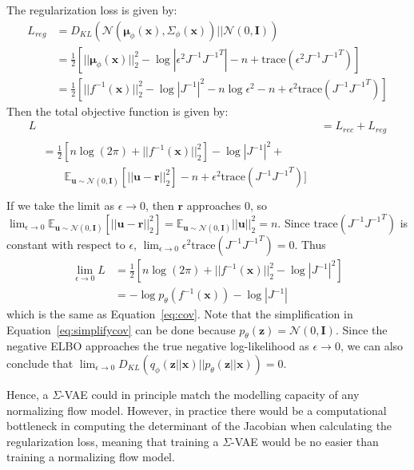 \documentclass{article}
\begin{document}
The regularization loss is given by:
\begin{align}
    L_{reg} &= D_{KL} ( \mathcal{N}(\boldsymbol \mu_\phi(\mathbf{x}), \Sigma_\phi(\mathbf{x})) || \mathcal{N}(0,\mathbf{I}) )\\
    &= \frac{1}{2}[|| \boldsymbol \mu_\phi(\mathbf{x}) ||_2^2 - \log |\epsilon^2 J^{-1} {J^{-1}}^T| - n + \text{trace}(\epsilon^2 J^{-1} {J^{-1}}^T) ]\\
    &=  \frac{1}{2}[|| f^{-1}(\mathbf{x}) ||_2^2 - \log |J^{-1}|^2 - n \log \epsilon^2 - n + \epsilon^2 \text{trace} ( J^{-1} {J^{-1}}^T)]
\end{align}
Then the total objective function is given by:
\begin{align}
    L &=L_{rec}+L_{reg}\\
    \begin{split}
        &= \frac{1}{2} [ n\log(2 \pi ) + || f^{-1}(\mathbf{x}) ||_2^2] - \log |J^{-1}|^2  + \\
       &\qquad  \mathbb{E}_{\mathbf{u}\sim \mathcal{N}(0,\mathbf{I})}[||\mathbf{u}-\mathbf{r}||_2^2] - n + \epsilon^2 \text{trace} ( J^{-1} {J^{-1}}^T)]\\
    \end{split} 
\end{align}
If we take the limit as $\epsilon \to 0$, then $\mathbf{r}$ approaches $0$, so  $\lim_{\epsilon\to 0} \mathbb{E}_{\mathbf{u}\sim \mathcal{N}(0,\mathbf{I})}[||\mathbf{u}-\mathbf{r}||_2^2] = \mathbb{E}_{\mathbf{u}\sim \mathcal{N}(0,\mathbf{I})}||\mathbf{u}||_2^2 = n$.
Since $\text{trace} ( J^{-1} {J^{-1}}^T)$ is constant with respect to $\epsilon$, $\lim_{\epsilon\to 0} \epsilon^2 \text{trace} ( J^{-1} {J^{-1}}^T) = 0$.
Thus 
\begin{align}
    \lim_{\epsilon\to 0} L &= \frac{1}{2} [ n\log(2 \pi ) + || f^{-1}(\mathbf{x}) ||_2^2 - \log |J^{-1}|^2 ] \\ 
    &= -\log p_\theta(f^{-1}(\mathbf{x})) - \log |J^{-1}| \label{eq:simplifycov}
\end{align}
which is the same as Equation~\ref{eq:cov}. 
Note that the simplification in Equation~\ref{eq:simplifycov} can be done because $p_\theta(\mathbf{z}) = \mathcal{N}(0,\mathbf{I})$.
Since the negative ELBO approaches the true negative log-likelihood as $\epsilon\to 0$, we can also conclude that $\lim_{\epsilon\to 0} D_{KL}( q_\phi(\mathbf{z}||\mathbf{x}) || p_\theta(\mathbf{z}||\mathbf{x})) = 0$.

Hence, a $\Sigma$-VAE could in principle match the modelling capacity of any normalizing flow model. However, in practice there would be a computational bottleneck in computing the determinant of the Jacobian when calculating the regularization loss, meaning that training a $\Sigma$-VAE would be no easier than training a normalizing flow model.
\end{document}
